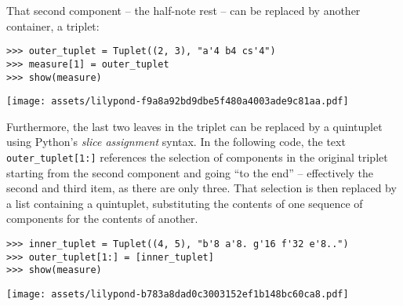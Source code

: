 \noindent That second component -- the half-note rest -- can be replaced by
another container, a triplet:

\begin{comment}
<abjad>
outer_tuplet = Tuplet((2, 3), "a'4 b4 cs'4")
measure[1] = outer_tuplet
show(measure)
</abjad>
\end{comment}

\begin{abjadbookoutput}
\begin{singlespacing}
\vspace{-0.5\baselineskip}
\begin{lstlisting}
>>> outer_tuplet = Tuplet((2, 3), "a'4 b4 cs'4")
>>> measure[1] = outer_tuplet
>>> show(measure)
\end{lstlisting}
\noindent\texttt{[image: assets/lilypond-f9a8a92bd9dbe5f480a4003ade9c81aa.pdf]}
\end{singlespacing}
\end{abjadbookoutput}

\noindent Furthermore, the last two leaves in the triplet can be replaced by a
quintuplet using Python's \emph{slice assignment} syntax. In the following
code, the text \texttt{outer\_tuplet[1:]} references the selection of
components in the original triplet starting from the second component and going
\enquote{to the end} -- effectively the second and third item, as there are
only three. That selection is then replaced by a list containing a quintuplet,
substituting the contents of one sequence of components for the contents of
another.

\begin{comment}
<abjad>
inner_tuplet = Tuplet((4, 5), "b'8 a'8. g'16 f'32 e'8..")
outer_tuplet[1:] = [inner_tuplet]
show(measure)
</abjad>
\end{comment}

\begin{abjadbookoutput}
\begin{singlespacing}
\vspace{-0.5\baselineskip}
\begin{lstlisting}
>>> inner_tuplet = Tuplet((4, 5), "b'8 a'8. g'16 f'32 e'8..")
>>> outer_tuplet[1:] = [inner_tuplet]
>>> show(measure)
\end{lstlisting}
\noindent\texttt{[image: assets/lilypond-b783a8dad0c3003152ef1b148bc60ca8.pdf]}
\end{singlespacing}
\end{abjadbookoutput}

